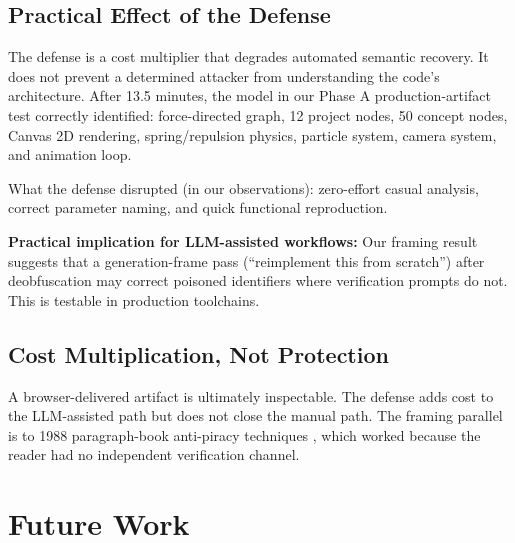\documentclass[11pt]{article}
\begin{document}
\subsection{Practical Effect of the Defense}

The defense is a cost multiplier that degrades automated semantic
recovery. It does not prevent a determined attacker from understanding
the code's architecture. After 13.5 minutes, the model in our Phase A production-artifact test
correctly identified: force-directed graph, 12 project nodes, 50
concept nodes, Canvas 2D rendering, spring/repulsion physics,
particle system, camera system, and animation loop.

What the defense disrupted (in our observations): zero-effort casual
analysis, correct parameter naming, and quick functional reproduction.

\textbf{Practical implication for LLM-assisted workflows:} Our framing
result suggests that a generation-frame pass (``reimplement this from
scratch'') after deobfuscation may correct poisoned identifiers where
verification prompts do not. This is testable in production toolchains.

\subsection{Cost Multiplication, Not Protection}

A browser-delivered artifact is ultimately inspectable. The defense
adds cost to the LLM-assisted path but does not close the manual
path. The framing parallel is to 1988 paragraph-book anti-piracy
techniques \cite{sentinel1988,wasteland2016}, which worked because the reader had no independent
verification channel.

\section{Future Work}
\end{document}
